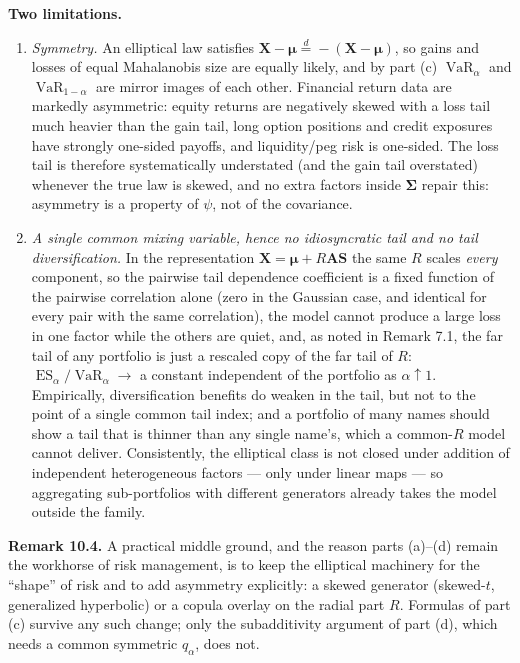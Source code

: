 \documentclass{MFM-hw} %
\newcommand{\VaR}{\operatorname{VaR}}
\newcommand{\ES}{\operatorname{ES}}
\newcommand{\bX}{\bm{X}}
\newcommand{\bA}{\bm{A}}
\newcommand{\bS}{\bm{S}}
\newcommand{\bmu}{\bm{\mu}}
\newcommand{\bSigma}{\bm{\Sigma}}
\begin{document}
\smallskip
\noindent\textbf{Two limitations.}
\begin{enumerate}
    \item \emph{Symmetry.} An elliptical law satisfies $\bX-\bmu\overset{d}{=}-(\bX-\bmu)$, so gains and losses of equal Mahalanobis size are equally likely, and by part (c) $\VaR_\alpha$ and $\VaR_{1-\alpha}$ are mirror images of each other. Financial return data are markedly asymmetric: equity returns are negatively skewed with a loss tail much heavier than the gain tail, long option positions and credit exposures have strongly one-sided payoffs, and liquidity/peg risk is one-sided. The loss tail is therefore systematically understated (and the gain tail overstated) whenever the true law is skewed, and no extra factors inside $\bSigma$ repair this: asymmetry is a property of $\psi$, not of the covariance.
    \item \emph{A single common mixing variable, hence no idiosyncratic tail and no tail diversification.} In the representation $\bX=\bmu+R\bA\bS$ the same $R$ scales \emph{every} component, so the pairwise tail dependence coefficient is a fixed function of the pairwise correlation alone (zero in the Gaussian case, and identical for every pair with the same correlation), the model cannot produce a large loss in one factor while the others are quiet, and, as noted in Remark 7.1, the far tail of any portfolio is just a rescaled copy of the far tail of $R$: $\ES_\alpha/\VaR_\alpha\to$ a constant independent of the portfolio as $\alpha\uparrow1$. Empirically, diversification benefits do weaken in the tail, but not to the point of a single common tail index; and a portfolio of many names should show a tail that is thinner than any single name's, which a common-$R$ model cannot deliver. Consistently, the elliptical class is not closed under addition of independent heterogeneous factors --- only under linear maps --- so aggregating sub-portfolios with different generators already takes the model outside the family.
\end{enumerate}

\smallskip
\noindent\textbf{Remark 10.4.} A practical middle ground, and the reason parts (a)--(d) remain the workhorse of risk management, is to keep the elliptical machinery for the ``shape'' of risk and to add asymmetry explicitly: a skewed generator (skewed-$t$, generalized hyperbolic) or a copula overlay on the radial part $R$. Formulas of part (c) survive any such change; only the subadditivity argument of part (d), which needs a common symmetric $q_\alpha$, does not.
\end{document}
